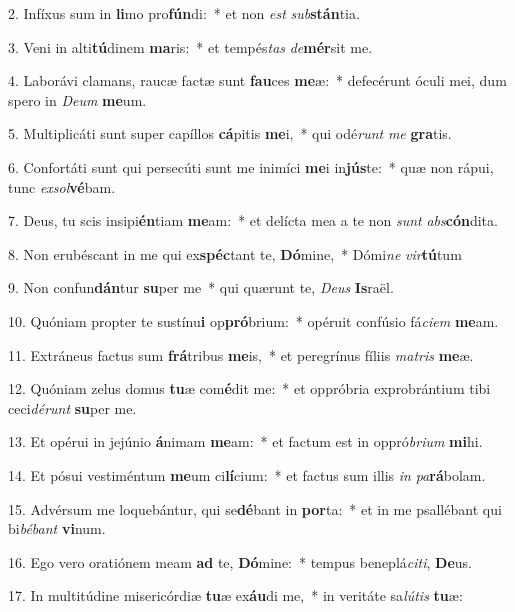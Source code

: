 2. Infíxus sum in \textbf{li}mo pro\textbf{fún}di:~*  et non \textit{est} \textit{sub}\textbf{stán}tia.\

3. Veni in alti\textbf{tú}dinem \textbf{ma}ris:~*  et tempés\textit{tas} \textit{de}\textbf{mér}sit me.\

4. Laborávi clamans, raucæ factæ sunt \textbf{fau}ces \textbf{me}æ:~*  defecérunt óculi mei, dum spero in \textit{De}\textit{um} \textbf{me}um.\

5. Multiplicáti sunt super capíllos \textbf{cá}pitis \textbf{me}i,~*  qui odé\textit{runt} \textit{me} \textbf{gra}tis.\

6. Confortáti sunt qui persecúti sunt me inimíci \textbf{me}i in\textbf{jús}te:~*  quæ non rápui, tunc \textit{ex}\textit{sol}\textbf{vé}bam.\

7. Deus, tu scis insipi\textbf{én}tiam \textbf{me}am:~*  et delícta mea a te non \textit{sunt} \textit{abs}\textbf{cón}dita.\

8. Non erubéscant in me qui ex\textbf{spéc}tant te, \textbf{Dó}mine,~*  Dómi\textit{ne} \textit{vir}\textbf{tú}tum\

9. Non confun\textbf{dán}tur \textbf{su}per me~*  qui quærunt te, \textit{De}\textit{us} \textbf{Is}raël.\

10. Quóniam propter te sustínu\textbf{i} op\textbf{pró}brium:~*  opéruit confúsio fá\textit{ci}\textit{em} \textbf{me}am.\

11. Extráneus factus sum \textbf{frá}tribus \textbf{me}is,~*  et peregrínus fíliis \textit{ma}\textit{tris} \textbf{me}æ.\

12. Quóniam zelus domus \textbf{tu}æ com\textbf{é}dit me:~*  et oppróbria exprobrántium tibi ceci\textit{dé}\textit{runt} \textbf{su}per me.\

13. Et opérui in jejúnio \textbf{á}nimam \textbf{me}am:~*  et factum est in oppró\textit{bri}\textit{um} \textbf{mi}hi.\

14. Et pósui vestiméntum \textbf{me}um ci\textbf{lí}cium:~*  et factus sum illis \textit{in} \textit{pa}\textbf{rá}bolam.\

15. Advérsum me loquebántur, qui se\textbf{dé}bant in \textbf{por}ta:~*  et in me psallébant qui bi\textit{bé}\textit{bant} \textbf{vi}num.\

16. Ego vero oratiónem meam \textbf{ad} te, \textbf{Dó}mine:~*  tempus beneplá\textit{ci}\textit{ti}, \textbf{De}us.\

17. In multitúdine misericórdiæ \textbf{tu}æ ex\textbf{áu}di me,~*  in veritáte sa\textit{lú}\textit{tis} \textbf{tu}æ:\

